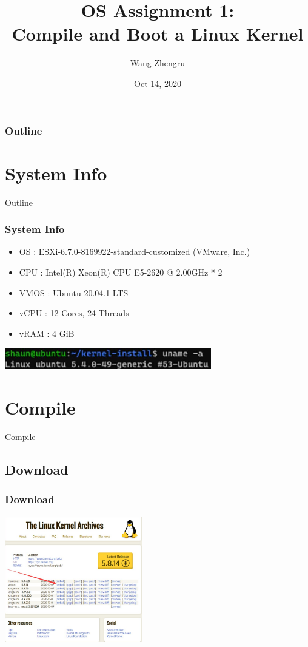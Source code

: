 \documentclass[aspectratio=169]{beamer}
\author{Wang Zhengru}
\title{OS Assignment 1: \\Compile and Boot a Linux Kernel}
\date{Oct 14, 2020}
\begin{document}
\frame[plain]{\titlepage}

\begin{frame}
  \frametitle{Outline}
  \tableofcontents
\end{frame}

\section{System Info}

\begin{frame}{Outline}
  \tableofcontents[currentsection]
\end{frame}

\begin{frame}
  \frametitle{System Info}
  \begin{itemize}
    \item OS : ESXi-6.7.0-8169922-standard-customized (VMware, Inc.)
    \item CPU : Intel(R) Xeon(R) CPU E5-2620 @ 2.00GHz * 2
    \item VMOS : Ubuntu 20.04.1 LTS
    \item vCPU : 12 Cores, 24 Threads
    \item vRAM : 4 GiB
  \end{itemize}
  \vspace{0.4cm}
  \includegraphics[width=9cm]{uname-old.jpg}
\end{frame}

\section{Compile}

\begin{frame}{Compile}
  \tableofcontents[currentsection]
\end{frame}

\subsection{Download}

\begin{frame}
  \frametitle{Download}
  \centering\includegraphics[width=6cm]{kernel-org.jpg}
\end{frame}
\end{document}
